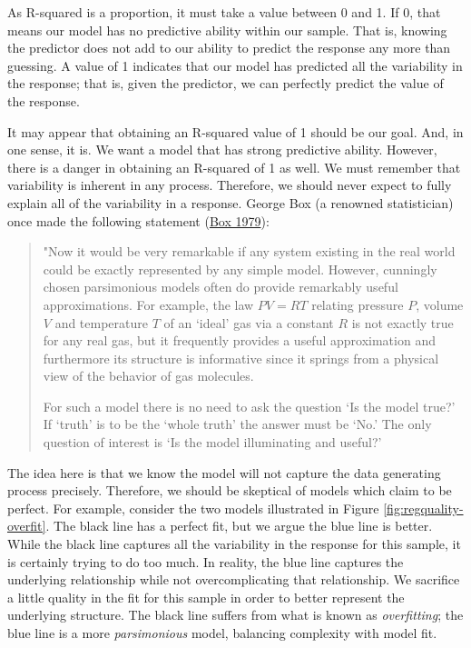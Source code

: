 \documentclass[
]{book}
\theoremstyle{plain}
\theoremstyle{mydefn}
\theoremstyle{myexmpl}
\theoremstyle{remark}
\begin{document}
As R-squared is a proportion, it must take a value between 0 and 1. If 0, that means our model has no predictive ability within our sample. That is, knowing the predictor does not add to our ability to predict the response any more than guessing. A value of 1 indicates that our model has predicted all the variability in the response; that is, given the predictor, we can perfectly predict the value of the response.

It may appear that obtaining an R-squared value of 1 should be our goal. And, in one sense, it is. We want a model that has strong predictive ability. However, there is a danger in obtaining an R-squared of 1 as well. We must remember that variability is inherent in any process. Therefore, we should never expect to fully explain all of the variability in a response. George Box (a renowned statistician) once made the following statement (\protect\hyperlink{ref-Box1979}{Box 1979}):

\begin{quote}
"Now it would be very remarkable if any system existing in the real world could be exactly represented by any simple model. However, cunningly chosen parsimonious models often do provide remarkably useful approximations. For example, the law \(PV = RT\) relating pressure \(P\), volume \(V\) and temperature \(T\) of an `ideal' gas via a constant \(R\) is not exactly true for any real gas, but it frequently provides a useful approximation and furthermore its structure is informative since it springs from a physical view of the behavior of gas molecules.

For such a model there is no need to ask the question `Is the model true?' If `truth' is to be the `whole truth' the answer must be `No.' The only question of interest is `Is the model illuminating and useful?'
\end{quote}

The idea here is that we know the model will not capture the data generating process precisely. Therefore, we should be skeptical of models which claim to be perfect. For example, consider the two models illustrated in Figure \ref{fig:regquality-overfit}. The black line has a perfect fit, but we argue the blue line is better. While the black line captures all the variability in the response for this sample, it is certainly trying to do too much. In reality, the blue line captures the underlying relationship while not overcomplicating that relationship. We sacrifice a little quality in the fit for this sample in order to better represent the underlying structure. The black line suffers from what is known as \emph{overfitting}; the blue line is a more \emph{parsimonious} model, balancing complexity with model fit.
\end{document}
